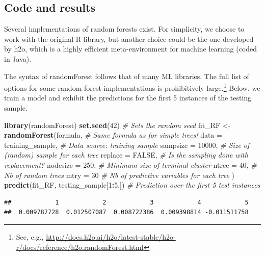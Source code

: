 \documentclass[]{krantz}
\makeatletter
\newenvironment{Shaded}{\begin{snugshade}}{\end{snugshade}}
\newcommand{\CommentTok}[1]{\textcolor[rgb]{0.37,0.37,0.37}{\textit{#1}}}
\newcommand{\DataTypeTok}[1]{\textcolor[rgb]{0.27,0.27,0.27}{#1}}
\newcommand{\DecValTok}[1]{\textcolor[rgb]{0.06,0.06,0.06}{#1}}
\newcommand{\KeywordTok}[1]{\textcolor[rgb]{0.27,0.27,0.27}{\textbf{#1}}}
\newcommand{\NormalTok}[1]{#1}
\newcommand{\OperatorTok}[1]{\textcolor[rgb]{0.43,0.43,0.43}{\textbf{#1}}}
\newcommand{\OtherTok}[1]{\textcolor[rgb]{0.37,0.37,0.37}{#1}}
\newcommand{\StringTok}[1]{\textcolor[rgb]{0.5,0.5,0.5}{#1}}
\newenvironment{kframe}{%
\medskip{}
\setlength{\fboxsep}{.8em}
 \def\at@end@of@kframe{}%
 \ifinner\ifhmode%
  \def\at@end@of@kframe{\end{minipage}}%
  \begin{minipage}{\columnwidth}%
 \fi\fi%
 \def\FrameCommand##1{\hskip\@totalleftmargin \hskip-\fboxsep
 \colorbox{shadecolor}{##1}\hskip-\fboxsep
     \hskip-\linewidth \hskip-\@totalleftmargin \hskip\columnwidth}%
 \MakeFramed {\advance\hsize-\width
   \@totalleftmargin\z@ \linewidth\hsize
   \@setminipage}}%
 {\par\unskip\endMakeFramed%
 \at@end@of@kframe}
\renewenvironment{Shaded}{\begin{kframe}}{\end{kframe}}
\let\rmarkdownfootnote\footnote%
\def\footnote{\protect\rmarkdownfootnote}
\theoremstyle{definition}
\theoremstyle{definition}
\theoremstyle{definition}
\theoremstyle{remark}
\makeatother
\begin{document}
\hypertarget{code-and-results-2}{%
\subsection{Code and results}\label{code-and-results-2}}

Several implementations of random forests exist. For simplicity, we
choose to work with the original R library, but another choice could be
the one developed by h2o, which is a highly efficient meta-environment
for machine learning (coded in Java).

The syntax of randomForest follows that of many ML libraries. The full
list of options for some random forest implementations is prohibitively
large.\footnote{See, e.g.,
  \url{http://docs.h2o.ai/h2o/latest-stable/h2o-r/docs/reference/h2o.randomForest.html}}
Below, we train a model and exhibit the predictions for the first 5
instances of the testing sample.

\footnotesize

\begin{Shaded}
\begin{Highlighting}[]
\KeywordTok{library}\NormalTok{(randomForest) }
\KeywordTok{set.seed}\NormalTok{(}\DecValTok{42}\NormalTok{)                                }\CommentTok{# Sets the random seed}
\NormalTok{fit_RF <-}\StringTok{ }\KeywordTok{randomForest}\NormalTok{(formula,             }\CommentTok{# Same formula as for simple trees!}
                 \DataTypeTok{data =}\NormalTok{ training_sample,    }\CommentTok{# Data source: training sample}
                 \DataTypeTok{sampsize =} \DecValTok{10000}\NormalTok{,          }\CommentTok{# Size of (random) sample for each tree}
                 \DataTypeTok{replace =} \OtherTok{FALSE}\NormalTok{,           }\CommentTok{# Is the sampling done with replacement?}
                 \DataTypeTok{nodesize =} \DecValTok{250}\NormalTok{,            }\CommentTok{# Minimum size of terminal cluster}
                 \DataTypeTok{ntree =} \DecValTok{40}\NormalTok{,                }\CommentTok{# Nb of random trees}
                 \DataTypeTok{mtry =} \DecValTok{30}                  \CommentTok{# Nb of predictive variables for each tree}
\NormalTok{    )}
\KeywordTok{predict}\NormalTok{(fit_RF, testing_sample[}\DecValTok{1}\OperatorTok{:}\DecValTok{5}\NormalTok{,])       }\CommentTok{# Prediction over the first 5 test instances }
\end{Highlighting}
\end{Shaded}

\begin{verbatim}
##            1            2            3            4            5 
##  0.009787728  0.012507087  0.008722386  0.009398814 -0.011511758
\end{verbatim}
\end{document}
